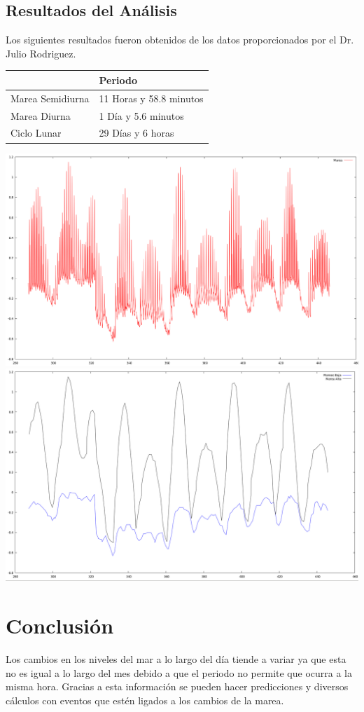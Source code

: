 \documentclass[12pt]{article}
\begin{document}
\subsection{Resultados del Análisis}
Los siguientes resultados fueron obtenidos de los datos  proporcionados por el Dr. Julio Rodriguez.
\begin{table}[h!]
   \centering
  \begin{tabular}{|p{5cm}|p{6cm}|}
  \hline
   & Periodo  \\   \hline
   Marea Semidiurna & 11 Horas y 58.8 minutos \\\hline
   Marea Diurna & 1 Día y 5.6 minutos\\\hline
   Ciclo Lunar & 29 Días y 6 horas\\\hline
    \end{tabular}
   \label{T2}
\end{table} 
\begin{center}
\includegraphics[width=15cm]{Marea.png}
\includegraphics[width=15cm]{MareaMm.png}
\end{center}
\pagebreak
\section{Conclusión}
Los cambios en los niveles del mar a lo largo del día tiende a variar ya que esta no es igual a lo largo del mes debido a que el periodo no permite que ocurra a la misma hora. Gracias a esta información se pueden hacer predicciones y diversos cálculos con eventos que estén ligados a los cambios de la marea. 
\end{document}
